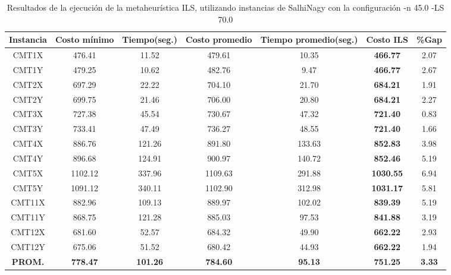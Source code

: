 \begin{table}[ht]
\caption{Resultados de la ejecución de la metaheurística ILS, utilizando instancias de SalhiNagy con la configuración -n 45.0 -LS 70.0}
\centering
\small
\begin{tabular}{c c c c c c c}
\hline\hline
Instancia & Costo mínimo & Tiempo(seg.) & Costo promedio & Tiempo promedio(seg.) & Costo ILS & \%Gap \\ [0.5ex]
\hline
CMT1X & 476.41 & 11.52 & 
479.61 & 10.35 & \bf{466.77} & 
2.07\\CMT1Y & 479.25 & 10.62 & 
482.76 & 9.47 & \bf{466.77} & 
2.67\\CMT2X & 697.29 & 22.22 & 
704.10 & 21.70 & \bf{684.21} & 
1.91\\CMT2Y & 699.75 & 21.46 & 
706.00 & 20.80 & \bf{684.21} & 
2.27\\CMT3X & 727.38 & 45.54 & 
730.67 & 47.32 & \bf{721.40} & 
0.83\\CMT3Y & 733.41 & 47.49 & 
736.27 & 48.55 & \bf{721.40} & 
1.66\\CMT4X & 886.76 & 121.26 & 
891.80 & 133.63 & \bf{852.83} & 
3.98\\CMT4Y & 896.68 & 124.91 & 
900.97 & 140.72 & \bf{852.46} & 
5.19\\CMT5X & 1102.12 & 337.96 & 
1109.63 & 291.88 & \bf{1030.55} & 
6.94\\CMT5Y & 1091.12 & 340.11 & 
1102.90 & 312.98 & \bf{1031.17} & 
5.81\\CMT11X & 882.96 & 109.13 & 
889.97 & 102.02 & \bf{839.39} & 
5.19\\CMT11Y & 868.75 & 121.28 & 
885.03 & 97.53 & \bf{841.88} & 
3.19\\CMT12X & 681.60 & 52.57 & 
684.32 & 49.90 & \bf{662.22} & 
2.93\\CMT12Y & 675.06 & 51.52 & 
680.42 & 44.93 & \bf{662.22} & 
1.94\\\bf{PROM.} & 
\bf{778.47} & \bf{101.26} & \bf{784.60} & \bf{95.13} & \bf{751.25} & \bf{3.33}\\[1ex]\hline
\end{tabular}
\label{table:nonlin}
\end{table} \clearpage
